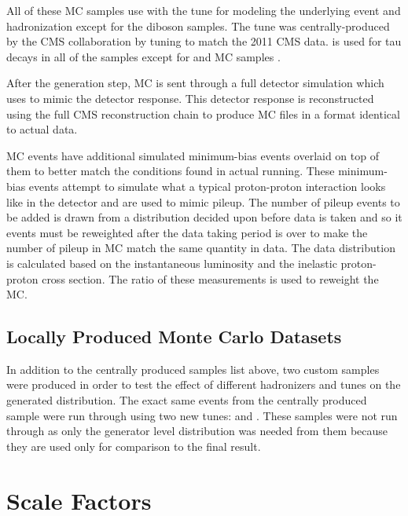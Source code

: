 All of these MC samples use \PYTHIAsix with the \ZTwoStar tune for modeling the
underlying event and hadronization except for the diboson samples. The
\ZTwoStar tune was centrally-produced by the CMS collaboration by tuning
\PYTHIAsix to match the 2011 CMS data. \Tauola is used for tau decays in all of
the samples except for \ttbar and \POWHEG \DYtoee MC samples \cite{was_2007}.



After the generation step, MC is sent through a full detector simulation which
uses \GEANTfour \cite{agostinelli2003} to mimic the detector response. This
detector response is reconstructed using the full CMS reconstruction chain to
produce MC files in a format identical to actual data.

MC events have additional simulated minimum-bias events overlaid on top of them
to better match the conditions found in actual running. These minimum-bias
events attempt to simulate what a typical proton-proton interaction looks like
in the detector and are used to mimic pileup. The number of pileup events to be
added is drawn from a distribution decided upon before data is taken and so it
events must be reweighted after the data taking period is over to make the
number of pileup in MC match the same quantity in data. The data distribution
is calculated based on the instantaneous luminosity and the inelastic
proton-proton cross section. The ratio of these measurements is used to
reweight the MC.

\subsection{Locally Produced Monte Carlo Datasets}
\label{ssec:custom_samples}

In addition to the centrally produced samples list above, two custom samples
were produced in order to test the effect of different hadronizers and tunes on
the generated \phistar distribution. The exact same events from the centrally
produced \POWHEG \DYtoee sample were run through \PYTHIAeight using two new
tunes: \TunePPfive and \TunePPfourteen. These samples were not run through
\GEANTfour as only the generator level \phistar distribution was needed from
them because they are used only for comparison to the final result.

\section{Scale Factors}
\label{sec:scale_factors}

